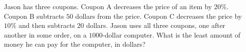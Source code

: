 Jason has three coupons. Coupon A decreases the price of an item by $20\%$. Coupon B subtracts $50$ dollars from the price. Coupon C decreases the price by $10\%$ and then subtracts $20$ dollars. Jason uses all three coupons, one after another in some order, on a $1000$-dollar computer. What is the least amount of money he can pay for the computer, in dollars?
